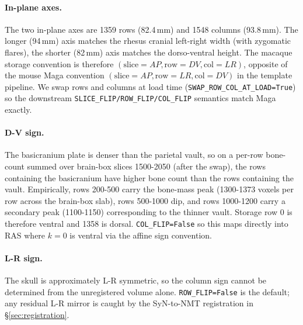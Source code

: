 \documentclass{compactarticle}
\begin{document}
\paragraph{In-plane axes.}
The two in-plane axes are 1359 rows (82.4\,mm) and 1548 columns
(93.8\,mm). The longer (94\,mm) axis matches the rhesus cranial
left-right width (with zygomatic flares), the shorter (82\,mm) axis
matches the dorso-ventral height. The macaque storage convention is
therefore $(\mathrm{slice}{=}AP, \mathrm{row}{=}DV, \mathrm{col}{=}LR)$,
opposite of the mouse Maga convention
$(\mathrm{slice}{=}AP, \mathrm{row}{=}LR, \mathrm{col}{=}DV)$ in the
template pipeline. We swap rows and columns at load time
(\texttt{SWAP\_ROW\_COL\_AT\_LOAD=True}) so the downstream
\texttt{SLICE\_FLIP/ROW\_FLIP/COL\_FLIP} semantics match Maga exactly.

\paragraph{D-V sign.}
The basicranium plate is denser than the parietal vault, so on a
per-row bone-count summed over brain-box slices 1500-2050 (after the
swap), the rows containing the basicranium have higher bone count than
the rows containing the vault. Empirically, rows 200-500 carry the
bone-mass peak (1300-1373 voxels per row across the brain-box slab),
rows 500-1000 dip, and rows 1000-1200 carry a secondary peak
(1100-1150) corresponding to the thinner vault. Storage row 0 is
therefore ventral and 1358 is dorsal. \texttt{COL\_FLIP=False} so this
maps directly into RAS where $k{=}0$ is ventral via the affine sign
convention.

\paragraph{L-R sign.}
The skull is approximately L-R symmetric, so the column sign cannot be
determined from the unregistered volume alone. \texttt{ROW\_FLIP=False}
is the default; any residual L-R mirror is caught by the SyN-to-NMT
registration in \S\ref{sec:registration}.
\end{document}

